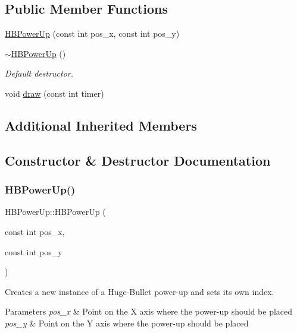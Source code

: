 \subsection*{Public Member Functions}
\begin{DoxyCompactItemize}
\item 
\hyperlink{classHBPowerUp_aa42f5cc3d894cbf0809d22c0f9f9926f}{H\+B\+Power\+Up} (const int pos\+\_\+x, const int pos\+\_\+y)
\item 
\hyperlink{classHBPowerUp_aa6eb33145fcb0f2c8ed0f9a43694aef4}{$\sim$\+H\+B\+Power\+Up} ()
\begin{DoxyCompactList}\small\item\em Default destructor. \end{DoxyCompactList}\item 
void \hyperlink{classHBPowerUp_ac9fcb7d3ef5f3a0561ffe0b6689944a1}{draw} (const int timer)
\end{DoxyCompactItemize}
\subsection*{Additional Inherited Members}


\subsection{Constructor \& Destructor Documentation}
\mbox{\label{classHBPowerUp_aa42f5cc3d894cbf0809d22c0f9f9926f}} 
\subsubsection{\texorpdfstring{H\+B\+Power\+Up()}{HBPowerUp()}}
{\footnotesize\ttfamily H\+B\+Power\+Up\+::\+H\+B\+Power\+Up (\begin{DoxyParamCaption}\item[{const int}]{pos\+\_\+x,  }\item[{const int}]{pos\+\_\+y }\end{DoxyParamCaption})}

Creates a new instance of a Huge-\/\+Bullet power-\/up and sets it\textquotesingle{}s own index.


\begin{DoxyParams}{Parameters}
{\em pos\+\_\+x} & Point on the X axis where the power-\/up should be placed \\
\hline
{\em pos\+\_\+y} & Point on the Y axis where the power-\/up should be placed \\
\hline
\end{DoxyParams}
\mbox{\label{classHBPowerUp_aa6eb33145fcb0f2c8ed0f9a43694aef4}} 
